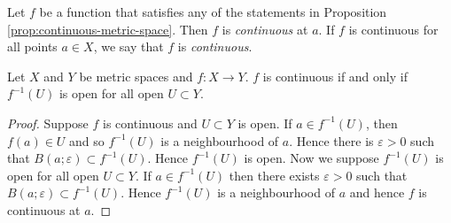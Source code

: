 \begin{definition}
	Let $f$ be a function that satisfies any of the statements in Proposition
	\ref{prop:continuous-metric-space}.
	Then $f$ is \emph{continuous} at $a$.
	If $f$ is continuous for all points $a \in X$, we say that $f$ is 
	\emph{continuous}.
\end{definition}

\begin{proposition}[]
	Let $X$ and $Y$ be metric spaces and $f: X \to Y$.
	$f$ is continuous if and only if $f^{-1}(U)$ is open for all open 
	$U \subset Y$.
\end{proposition}

\begin{proof}
	Suppose $f$ is continuous and $U \subset Y$ is open.
	If $a \in f^{-1}(U)$, then $f(a) \in U$ and so $f^{-1}(U)$ is a neighbourhood
	of $a$.
	Hence there is $\varepsilon > 0$ such that 
	$B(a; \varepsilon) \subset f^{-1}(U)$.
	Hence $f^{-1}(U)$ is open.
	Now we suppose $f^{-1}(U)$ is open for all open $U \subset Y$.
	If $a \in f^{-1}(U)$ then there exists $\varepsilon > 0$ such that
	$B(a; \varepsilon) \subset f^{-1}(U)$. 
	Hence $f^{-1}(U)$ is a neighbourhood of $a$ and hence $f$ is continuous at
	$a$.
\end{proof}

